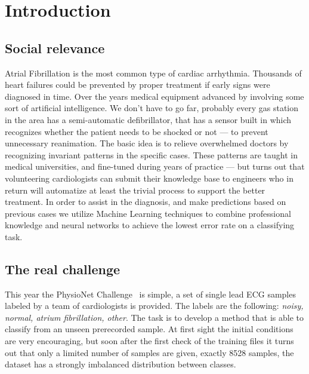 \chapter{Introduction}


\section{Social relevance}
Atrial Fibrillation is the most common type of cardiac arrhythmia.
Thousands of heart failures could be prevented by proper treatment if early signs were diagnosed in time.
Over the years medical equipment advanced by involving some sort of artificial intelligence.
We don't have to go far, probably every gas station in the area has a semi-automatic defibrillator, that has a sensor built in which recognizes whether the patient needs to be shocked or not --- to prevent unnecessary reanimation.
The basic idea is to relieve overwhelmed doctors by recognizing invariant patterns in the specific cases.
These patterns are taught in medical universities, and fine-tuned during years of practice --- but turns out that volunteering cardiologists can submit their knowledge base to engineers who in return will automatize at least the trivial process to support the better treatment.
In order to assist in the diagnosis, and make predictions based on previous cases we utilize Machine Learning techniques to combine professional knowledge and neural networks to achieve the lowest error rate on a classifying task.
%

\section{The real challenge}
This year the PhysioNet Challenge~\cite{noauthor_af_nodate} is simple, a set of single lead ECG samples labeled by a team of cardiologists is provided. The labels are the following: \textit{noisy, normal, atrium fibrillation, other}. The task is to develop a method that is able to classify from an unseen prerecorded sample.
At first sight the initial conditions are very encouraging, but soon after the first check of the training files it turns out that only a limited number of samples are given, exactly 8528 samples, the dataset has a strongly imbalanced distribution between classes.

